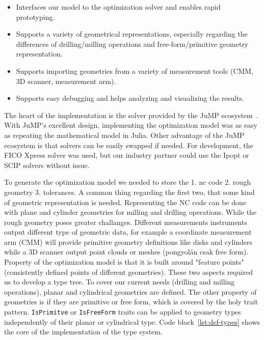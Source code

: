 \documentclass{juliacon}
\begin{document}
\begin{itemize}
	\item Interfaces our model to the optimization solver and enables rapid prototyping.
	\item Supports a variety of geometrical representations, especially regarding the differences of drilling/milling operations and free-form/primitive geometry representation.
	\item Supports importing geometries from a variety of measurement tools (CMM, 3D scanner, measurement arm).
	\item Supports easy debugging and helps analyzing and visualizing the results.
\end{itemize}

The heart of the implementation is the solver provided by the JuMP ecosystem~\cite{Lubin2023}.
With JuMP's excellent design, implementing the optimization model was as easy as repeating the mathematical model in Julia.
Other advantage of the JuMP ecosystem is that solvers can be easily swapped if needed.
For development, the FICO Xpress solver was used, but our industry partner could use the Ipopt or SCIP solvers without issue.


To generate the optimization model we needed to store the 1. nc code 2. rough geometry 3. tolerances.
A common thing regarding the first two, that some kind of geometric representation is needed.
Representing the NC code can be done with plane and cylinder geometries for milling and drilling operations.
While the rough geometry poses greater challanges.
Different measurements instruments output different type of geometric data, for example a coordinate measurement arm (CMM) will provide primitive geometry definitions like disks and cylinders while a 3D scanner output point clouds or meshes (pongyolán csak free form).
Property of the optimization model is that it is built around "feature points" (consistently defined points of different geometries).
These two aspects required us to develop a type tree.
To cover our current needs (drilling and milling operations), planar and cylindrical geometries are defined.
The other property of geometries is if they are primitive or free form, which is covered by the holy trait pattern.
\texttt{IsPrimitve} or \texttt{IsFreeForm} traits can be applied to geometry types independently of their planar or cylindrical type.
Code block~\ref{lst:def-types} shows the core of the implementation of the type system.
\end{document}
